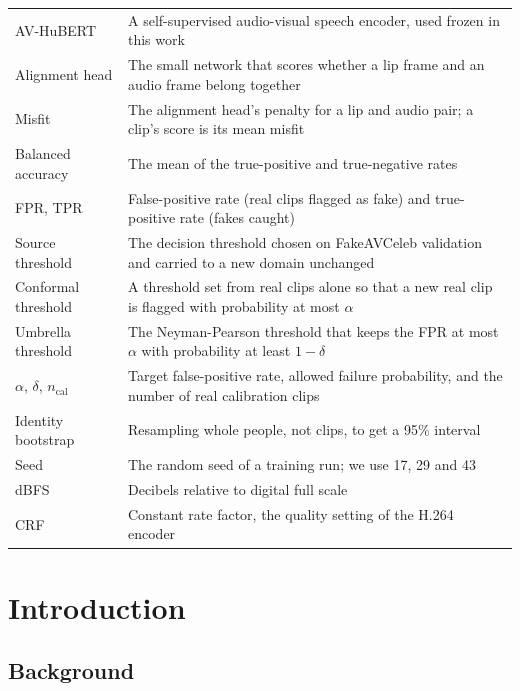 \begin{longtable}{@{}>{\raggedright\arraybackslash}p{}>{\raggedright\arraybackslash}p{}@{}}
    AV-HuBERT           & A self-supervised audio-visual speech encoder, used frozen in this work \\
    Alignment head      & The small network that scores whether a lip frame and an audio frame belong together \\
    Misfit              & The alignment head's penalty for a lip and audio pair; a clip's score is its mean misfit \\
    Balanced accuracy   & The mean of the true-positive and true-negative rates \\
    FPR, TPR            & False-positive rate (real clips flagged as fake) and true-positive rate (fakes caught) \\
    Source threshold    & The decision threshold chosen on FakeAVCeleb validation and carried to a new domain unchanged \\
    Conformal threshold & A threshold set from real clips alone so that a new real clip is flagged with probability at most $\alpha$ \\
    Umbrella threshold  & The Neyman-Pearson threshold that keeps the FPR at most $\alpha$ with probability at least $1-\delta$ \\
    $\alpha$, $\delta$, $n_{\mathrm{cal}}$ & Target false-positive rate, allowed failure probability, and the number of real calibration clips \\
    Identity bootstrap  & Resampling whole people, not clips, to get a 95\% interval \\
    Seed                & The random seed of a training run; we use 17, 29 and 43 \\
    dBFS                & Decibels relative to digital full scale \\
    CRF                 & Constant rate factor, the quality setting of the H.264 encoder \\
    \bottomrule
\end{longtable}

\clearpage

\setcounter{page}{1}

%
\chapter{Introduction}
\label{ch:introduction}

\section{Background}


